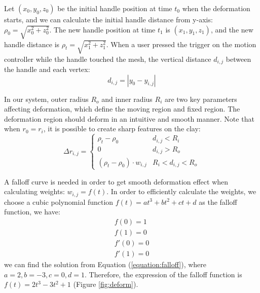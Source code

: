 \documentclass{svjour3}                     %
\begin{document}
Let $(x_{0},y_{0},z_{0})$ be the initial handle position at time $t_{0}$ when the deformation starts, and we can calculate the initial handle distance from y-axis: $\rho_{0} = \sqrt{x_{0}^2 + z_{0}^2}$. The new handle position at time $t_{1}$ is $(x_{1},y_{1},z_{1})$, and the new handle distance is $\rho_{t} = \sqrt{x_{1}^2 + z_{1}^2}$.
When a user pressed the trigger on the motion controller while the handle touched the mesh, the vertical distance $d_{i,j}$ between the handle and each vertex:
\begin{equation}
d_{i,j} = |y_{0} - y_{i,j}|
\end{equation}

In our system, outer radius $R_{o}$ and inner radius $R_{i}$ are two key parameters affecting deformation, which define the moving region and fixed region. The deformation region should deform in an intuitive and smooth manner. Note that when $r_{0} = r_{i}$, it is possible to create sharp features on the clay:
\begin{equation}
\Delta r_{i,j} = \begin{cases}
\rho_{t} - \rho_{0} &  d_{i,j} < R_{i} \\
0 &  d_{i,j} > R_{o} \\
(\rho_{t} - \rho_{0}) \cdot w_{i,j} &  R_{i} < d_{i,j} < R_{o}
\end{cases}
\end{equation}

A falloff curve is needed in order to get smooth deformation effect when calculating weights: $w_{i,j} = f(t)$. In order to efficiently calculate the weights, we choose a cubic polynomial function $f(t) = at^3 + bt^2 + ct + d$ as the falloff function, we have:
\begin{equation}
\begin{aligned}
\label{equation:falloff}
f(0) = 1 \\
f(1) = 0 \\ 
f'(0) = 0 \\
f'(1) = 0
\end{aligned}
\end{equation}
we can find the solution from Equation (\ref{equation:falloff}), where 
$a = 2, b = -3, c = 0, d = 1$. Therefore, the expression of the falloff function is $f(t) = 2t^3 - 3t^2 + 1$ (Figure \ref{fig:deform}).
\end{document}
